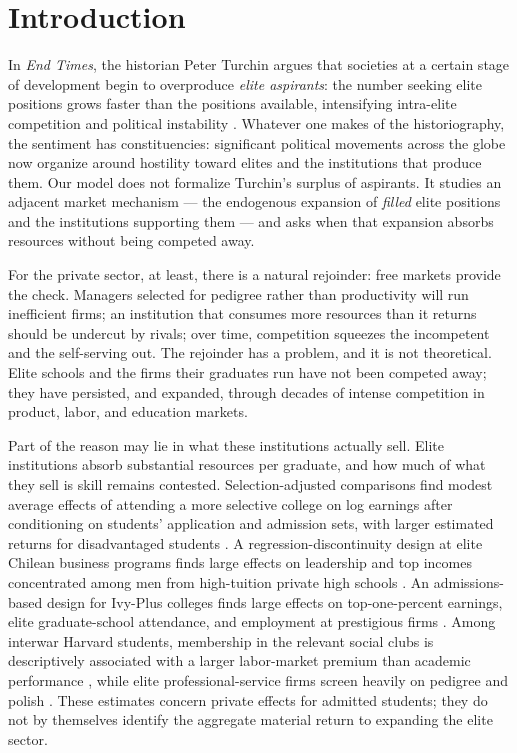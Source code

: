 \documentclass[12pt,letterpaper]{article}
\theoremstyle{definition}
\begin{document}
\onehalfspacing

\section{Introduction}\label{sec:intro}

In \emph{End Times}, the historian Peter Turchin argues that societies at a certain stage of development begin to overproduce \emph{elite aspirants}: the number seeking elite positions grows faster than the positions available, intensifying intra-elite competition and political instability \citep{turchin2023endtimes}.
Whatever one makes of the historiography, the sentiment has constituencies: significant political movements across the globe now organize around hostility toward elites and the institutions that produce them.
Our model does not formalize Turchin's surplus of aspirants.
It studies an adjacent market mechanism --- the endogenous expansion of \emph{filled} elite positions and the institutions supporting them --- and asks when that expansion absorbs resources without being competed away.

For the private sector, at least, there is a natural rejoinder: free markets provide the check.
Managers selected for pedigree rather than productivity will run inefficient firms; an institution that consumes more resources than it returns should be undercut by rivals; over time, competition squeezes the incompetent and the self-serving out.
The rejoinder has a problem, and it is not theoretical.
Elite schools and the firms their graduates run have not been competed away; they have persisted, and expanded, through decades of intense competition in product, labor, and education markets.

Part of the reason may lie in what these institutions actually sell.
Elite institutions absorb substantial resources per graduate, and how much of what they sell is skill remains contested.
Selection-adjusted comparisons find modest average effects of attending a more selective college on log earnings after conditioning on students' application and admission sets, with larger estimated returns for disadvantaged students \citep{dalekrueger2002}.
A regression-discontinuity design at elite Chilean business programs finds large effects on leadership and top incomes concentrated among men from high-tuition private high schools \citep{zimmerman2019elite}.
An admissions-based design for Ivy-Plus colleges finds large effects on top-one-percent earnings, elite graduate-school attendance, and employment at prestigious firms \citep{chettydemingfriedman2026}.
Among interwar Harvard students, membership in the relevant social clubs is descriptively associated with a larger labor-market premium than academic performance \citep{michelmanpricezimmerman2022}, while elite professional-service firms screen heavily on pedigree and polish \citep{rivera2015pedigree}.
These estimates concern private effects for admitted students; they do not by themselves identify the aggregate material return to expanding the elite sector.
\end{document}
